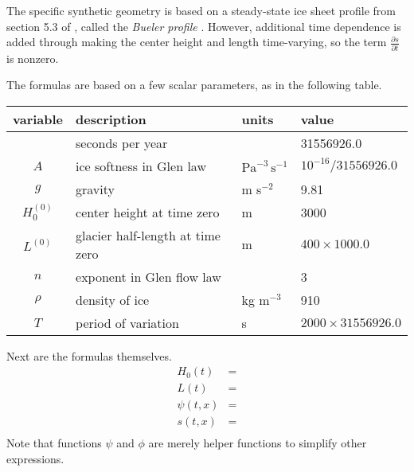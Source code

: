 \documentclass[letterpaper,final,12pt,reqno]{amsart}
\begin{document}
The specific synthetic geometry is based on a steady-state ice sheet profile from section 5.3 of \cite{vanderVeen2013}, called the \emph{Bueler profile} \cite{Bueler2003}.  However, additional time dependence is added through making the center height and length time-varying, so the term $\frac{\partial s}{\partial t}$ is nonzero.

The formulas are based on a few scalar parameters, as in the following table.

\bigskip
\begin{tabular}{clll}
variable  & description & units & value \\
\hline
    & seconds per year &  & 31556926.0 \\
$A$ & ice softness in Glen law & $\text{Pa}^{-3}\,\text{s}^{-1}$ & $10^{-16}/31556926.0$ \\
$g$ & gravity & m s$^{-2}$ & 9.81 \\
$H_0^{(0)}$ & center height at time zero & m & 3000 \\
$L^{(0)}$ & glacier half-length at time zero & m & $400 \times 1000.0$ \\
$n$ & exponent in Glen flow law & & 3 \\
$\rho$ & density of ice & kg m$^{-3}$ & 910 \\
$T$ & period of variation & s & $2000 \times 31556926.0$
\end{tabular}
\bigskip

Next are the formulas themselves.
\begin{align}
H_0(t) &= \\
L(t) &= \\
\psi(t,x) &= \\
s(t,x) &= \\
\end{align}
Note that functions $\psi$ and $\phi$ are merely helper functions to simplify other expressions.

\small
\bigskip


\end{document}
